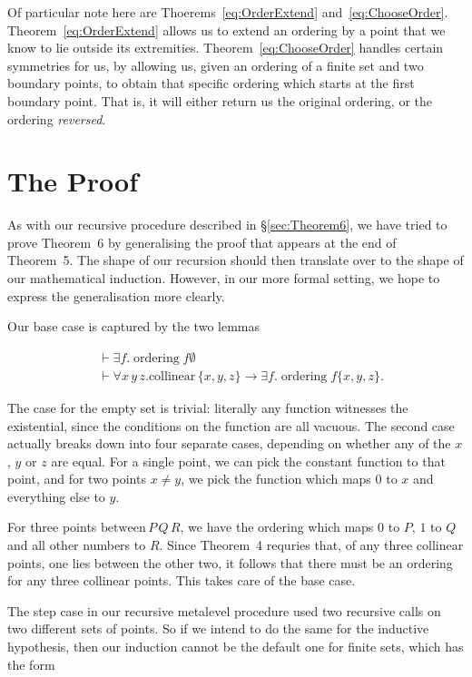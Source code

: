 \documentclass{article}
\DeclareMathOperator{\ordering}{ordering}
\newcommand{\collinear}[1]{\text{collinear}\,#1}
\newcommand{\between}[3]{\text{between}\,#1\,#2\,#3}
\renewcommand{\implies}{\longrightarrow}
\begin{document}
Of particular note here are Thoerems~\eqref{eq:OrderExtend} and~\eqref{eq:ChooseOrder}. Theorem~\eqref{eq:OrderExtend} allows us to extend an ordering by a point that we know to lie outside its extremities. Theorem~\eqref{eq:ChooseOrder} handles certain symmetries for us, by allowing us, given an ordering of a finite set and two boundary points, to obtain that specific ordering which starts at the first boundary point. That is, it will either return us the original ordering, or the ordering \emph{reversed}.

\section{The Proof}
As with our recursive procedure described in \S\ref{sec:Theorem6}, we have tried to prove Theorem~6 by generalising the proof that appears at the end of Theorem~5. The shape of our recursion should then translate over to the shape of our mathematical induction. However, in our more formal setting, we hope to express the generalisation more clearly. 

Our base case is captured by the two lemmas

\begin{align*}
&\vdash \exists f. \ordering{f}{\emptyset}\\
&\vdash \forall x\,y\,z. \collinear \{x,y,z\} \implies \exists f. \ordering{f}{\{x,y,z\}}.
\end{align*}

The case for the empty set is trivial: literally any function witnesses the existential, since the conditions on the function are all vacuous. The second case actually breaks down into four separate cases, depending on whether any of the $x$, $y$ or $z$ are equal. For a single point, we can pick the constant function to that point, and for two points $x \neq y$, we pick the function which maps $0$ to $x$ and everything else to $y$.

For three points $\between{P}{Q}{R}$, we have the ordering which maps $0$ to $P$, $1$ to $Q$ and all other numbers to $R$. Since Theorem~4 requries that, of any three collinear points, one lies between the other two, it follows that there must be an ordering for any three collinear points. This takes care of the base case.

The step case in our recursive metalevel procedure used two recursive calls on two different sets of points. So if we intend to do the same for the inductive hypothesis, then our induction cannot be the default one for finite sets, which has the form
\end{document}
